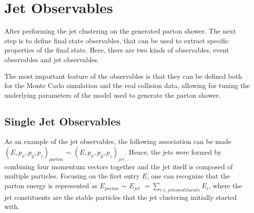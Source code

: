 \chapter{Jet Observables}

After performing the jet clustering on the generated parton shower. The next step is to define final state observables, that can be used to extract specific properties of the final state. Here, there are two kinds of observables, event observables and jet observables.  

The most important feature of the observables is that they can be defined both for the Monte Carlo simulation and the real collision data, allowing for tuning the underlying parameters of the model used to generate the parton shower. 
\section{Single Jet Observables}


As an example of the jet observables, the following association can be made $(E, p_x, p_y, p_z)_{parton}$ $\sim$ $(E, p_x, p_y, p_z)_{jet}$. Hence, the jets were formed by combining four momentum vectors together and the jet itself is composed of multiple particles. Focusing on the first entry $E$, one can recognize that the parton energy is represented as $E_{parton}$ $\sim$ $E_{jet}$  $= \sum_{i \in jet constituents} E_{i}$, where the jet constituents are the stable particles that the jet clustering initially started with. 

